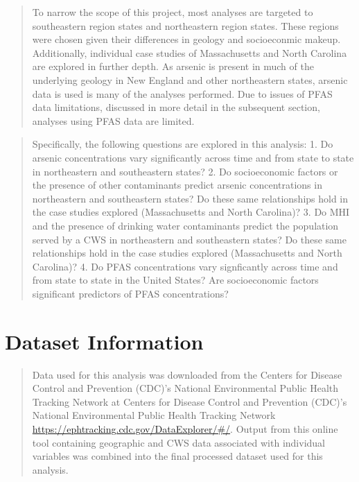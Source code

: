 \documentclass[12pt,]{article}
\begin{document}
\begin{quote}
To narrow the scope of this project, most analyses are targeted to
southeastern region states and northeastern region states. These regions
were chosen given their differences in geology and socioeconmic makeup.
Additionally, individual case studies of Massachusetts and North
Carolina are explored in further depth. As arsenic is present in much of
the underlying geology in New England and other northeastern states,
arsenic data is used is many of the analyses performed. Due to issues of
PFAS data limitations, discussed in more detail in the subsequent
section, analyses using PFAS data are limited.
\end{quote}

\begin{quote}
Specifically, the following questions are explored in this analysis: 1.
Do arsenic concentrations vary significantly across time and from state
to state in northeastern and southeastern states? 2. Do socioeconomic
factors or the presence of other contaminants predict arsenic
concentrations in northeastern and southeastern states? Do these same
relationships hold in the case studies explored (Massachusetts and North
Carolina)? 3. Do MHI and the presence of drinking water contaminants
predict the population served by a CWS in northeastern and southeastern
states? Do these same relationships hold in the case studies explored
(Massachusetts and North Carolina)? 4. Do PFAS concentrations vary
signficantly across time and from state to state in the United States?
Are socioeconomic factors significant predictors of PFAS concentrations?
\end{quote}

\newpage

\hypertarget{dataset-information}{%
\section{Dataset Information}\label{dataset-information}}

\begin{quote}
Data used for this analysis was downloaded from the Centers for Disease
Control and Prevention (CDC)'s National Environmental Public Health
Tracking Network at Centers for Disease Control and Prevention (CDC)'s
National Environmental Public Health Tracking Network
\url{https://ephtracking.cdc.gov/DataExplorer/\#/}. Output from this
online tool containing geographic and CWS data associated with
individual variables was combined into the final processed dataset used
for this analysis.
\end{quote}
\end{document}
